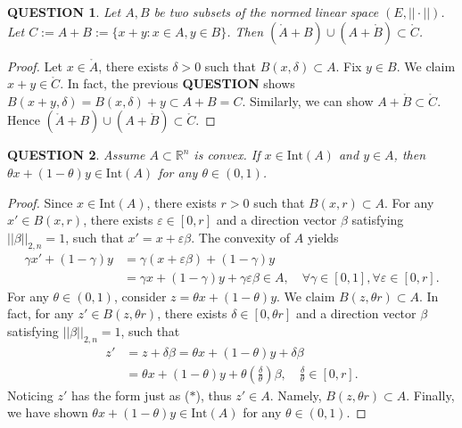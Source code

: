 \documentclass[12pt]{article}
\renewcommand{\(}{\left(}%
\renewcommand{\)}{\right)}%
\renewcommand{\[}{\left[}%
\renewcommand{\]}{\right]}%
\renewcommand{\r}{\mathbb{R}}
\newtheorem{question}{QUESTION}[section]}
\newtheorem{proof}{Proof.}}
\begin{document}
  \begin{question}
  	Let $A,B$ be two subsets of the normed linear space $(E,||\cdot||)$. Let $C:=A+B:=\{x+y:x\in A,y\in B\}$. Then $(\mathring{A}+B)\cup(A+\mathring{B})\subset \mathring{C}$.
  \end{question}
  \begin{proof}
  	Let $x\in \mathring{A}$, there exists $\delta>0$ such that $B(x,\delta)\subset A$. Fix $y\in B$. We claim $x+y\in \mathring{C}$. In fact, the previous {\bfseries QUESTION} shows $B(x+y,\delta)=B(x,\delta)+y\subset A+B=C$. Similarly, we can show $A+\mathring{B}\subset \mathring{C}$. Hence $(\mathring{A}+B)\cup(A+\mathring{B})\subset \mathring{C}$.
  \end{proof}
  
  \begin{question}
  	Assume $A\subset\r^n$ is convex. If $x\in \mathrm{Int}(A)$ and $y\in A$, then $\theta x+(1-\theta)y\in \mathrm{Int}(A)$ for any $\theta\in(0,1)$.
  \end{question}
  \begin{proof}
  	Since $x\in \mathrm{Int}(A)$, there exists $r>0$ such that $B(x,r)\subset A$. For any $x'\in B(x,r)$, there exists $\varepsilon\in[0,r]$ and a direction vector $\beta$ satisfying $||\beta||_{2,n}=1$, such that $x'=x+\varepsilon\beta$. The convexity of $A$ yields
  	\begin{equation*}
  		\begin{split}
  			\gamma x'+(1-\gamma)y&=\gamma(x+\varepsilon\beta)+(1-\gamma)y\\
  			&=\gamma x+(1-\gamma)y+\gamma\varepsilon\beta\in A,\quad \forall \gamma\in[0,1],\forall\varepsilon\in[0,r].
  		\end{split}\tag{$*$}
  	\end{equation*}
  	For any $\theta\in (0,1)$, consider $z=\theta x+(1-\theta)y$. We claim $B(z,\theta r)\subset A$. In fact, for any $z'\in B(z,\theta r)$, there exists $\delta\in[0,\theta r]$ and a direction vector $\beta$ satisfying $||\beta||_{2,n}=1$, such that 
  	\begin{equation*}
  		\begin{split}
  			z'&=z+\delta\beta=\theta x+(1-\theta)y+\delta\beta\\
  			&=\theta x+(1-\theta)y+\theta\(\frac{\delta}{\theta}\) \beta,\quad \frac{\delta}{\theta}\in[0,r].
  		\end{split}
  	\end{equation*}
  	Noticing $z'$ has the form just as ($*$), thus $z'\in A$. Namely, $B(z,\theta r)\subset A$. Finally, we have shown $\theta x+(1-\theta)y\in \mathrm{Int}(A)$ for any $\theta\in(0,1)$.
  \end{proof}
\end{document}
